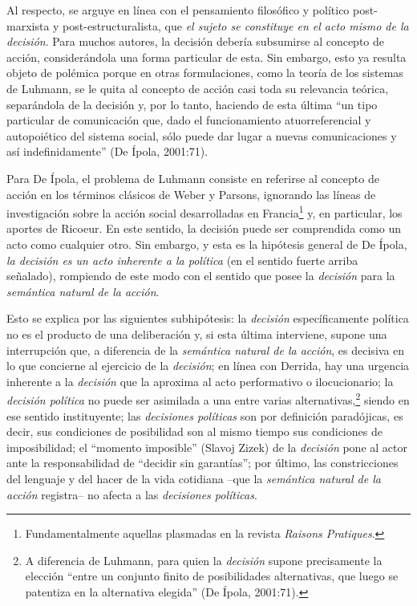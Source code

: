Al respecto, se arguye en línea con el pensamiento filosófico y político post-marxista y post-estructuralista, que \emph{el sujeto se constituye en el acto mismo de la} \emph{decisión}. Para muchos autores, la decisión debería subsumirse al concepto de acción, considerándola una forma particular de esta. Sin embargo, esto ya resulta objeto de polémica porque en otras formulaciones, como la teoría de los sistemas de Luhmann, se le quita al concepto de acción casi toda su relevancia teórica, separándola de la decisión y, por lo tanto, haciendo de esta última \enquote{un tipo particular de comunicación que, dado el funcionamiento atuorreferencial y autopoiético del sistema social, sólo puede dar lugar a nuevas comunicaciones y así indefinidamente} (De Ípola, 2001:71).

Para De Ípola, el problema de Luhmann consiste en referirse al concepto de acción en los términos clásicos de Weber y Parsons, ignorando las líneas de investigación sobre la acción social desarrolladas en Francia\footnote{Fundamentalmente aquellas plasmadas en la revista \emph{Raisons Pratiques}.} y, en particular, los aportes de Ricoeur. En este sentido, la decisión puede ser comprendida como un acto como cualquier otro. Sin embargo, y esta es la hipótesis general de De Ípola, \emph{la decisión es un acto inherente a la política} (en el sentido fuerte arriba señalado), rompiendo de este modo con el sentido que posee la \emph{decisión} para la \emph{semántica natural de la acción}.

Esto se explica por las siguientes subhipótesis: la \emph{decisión} específicamente política no es el producto de una deliberación y, si esta última interviene, supone una interrupción que, a diferencia de la \emph{semántica natural de la acción}, es decisiva en lo que concierne al ejercicio de la \emph{decisión}; en línea con Derrida, hay una urgencia inherente a la \emph{decisión} que la aproxima al acto performativo o ilocucionario; la \emph{decisión política} no puede ser asimilada a una entre varias alternativas,\footnote{A diferencia de Luhmann, para quien la \emph{decisión} supone precisamente la elección \enquote{entre un conjunto finito de posibilidades alternativas, que luego se patentiza en la alternativa elegida} (De Ípola, 2001:71).} siendo en ese sentido instituyente; las \emph{decisiones políticas} son por definición paradójicas, es decir, sus condiciones de posibilidad son al mismo tiempo sus condiciones de imposibilidad; el \enquote{momento imposible} (Slavoj Zizek) de la \emph{decisión} pone al actor ante la responsabilidad de \enquote{decidir sin garantías}; por último, las constricciones del lenguaje y del hacer de la vida cotidiana --que la \emph{semántica natural de la acción} registra-- no afecta a las \emph{decisiones políticas}.

